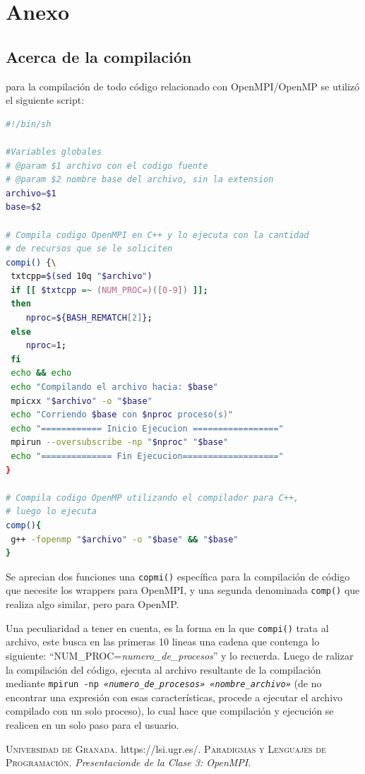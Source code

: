 \documentclass{article}
\begin{document}
\newpage
\section{Anexo}
\subsection{Acerca de la compilaci\'on}
\label{an:compilacion}
para la compilación de todo código relacionado con OpenMPI/OpenMP se utilizó el
siguiente script:

\begin{lstlisting}[language=bash, caption={Script de compilaci\'on}]
#!/bin/sh

#Variables globales
# @param $1 archivo con el codigo fuente
# @param $2 nombre base del archivo, sin la extension
archivo=$1
base=$2

# Compila codigo OpenMPI en C++ y lo ejecuta con la cantidad
# de recursos que se le soliciten
compi() {\
 txtcpp=$(sed 10q "$archivo")
 if [[ $txtcpp =~ (NUM_PROC=)([0-9]) ]];
 then
    nproc=${BASH_REMATCH[2]};
 else
    nproc=1;
 fi
 echo && echo
 echo "Compilando el archivo hacia: $base"
 mpicxx "$archivo" -o "$base"
 echo "Corriendo $base con $nproc proceso(s)"
 echo "============ Inicio Ejecucion ================="
 mpirun --oversubscribe -np "$nproc" "$base"
 echo "============== Fin Ejecucion==================="
}

# Compila codigo OpenMP utilizando el compilador para C++,
# luego lo ejecuta
comp(){
 g++ -fopenmp "$archivo" -o "$base" && "$base"
}
\end{lstlisting}

Se aprecian dos funciones una \texttt{copmi()} espec\'ifica para la compilaci\'on
de c\'odigo que necesite los wrappers para OpenMPI, y una segunda denominada
\texttt{comp()} que realiza algo similar, pero para OpenMP.

Una peculiaridad a tener en cuenta, es la forma en la que \texttt{compi()}
trata al archivo, este busca en las primeras 10 lineas una cadena que contenga
lo siguiente: ``NUM\_PROC=\textit{numero\_de\_procesos}'' y lo recuerda. Luego de
ralizar la compilaci\'on del c\'odigo, ejecuta al archivo resultante de
la compilaci\'on mediante \texttt{mpirun -np \textit{«numero\_de\_procesos»
«nombre\_archivo»}} (de no encontrar una expresi\'on con esas caracter\'isticas,
procede a ejecutar el archivo compilado con un solo proceso), lo cual hace que compilaci\'on y
ejecuci\'on se realicen en un solo paso para el usuario.


\newpage
\begin{thebibliography}{99}
	 \textsc{Universidad de
Granada}. https://lsi.ugr.es/.
	\textsc{Paradigmas y
Lenguajes de Programaci\'on}. \textit{Presentacionde de la Clase 3: OpenMPI}.
\end{thebibliography}
\end{document}
